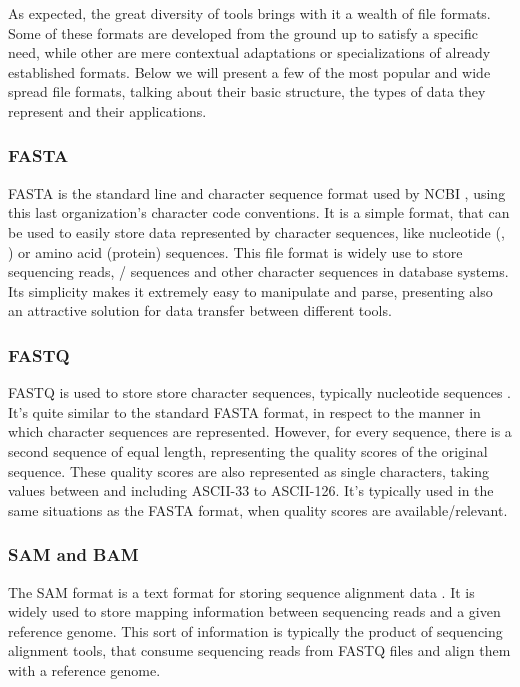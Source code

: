 As expected, the great diversity of \rnaseq{} tools brings with it a wealth of
file formats. Some of these formats are developed from the ground up to satisfy
a specific need, while other are mere contextual adaptations or specializations
of already established formats. Below we will present a few of the most popular
and wide spread file formats, talking about their basic structure, the types of
data they represent and their applications.

\subsubsection*{FASTA}

FASTA is the standard line and character sequence format used by NCBI
\cite{ncbi:fasta}, using this last organization's character code conventions. It
is a simple format, that can be used to easily store data represented by
character sequences, like nucleotide (\dna, \rna) or amino acid (protein)
sequences. This file format is widely use to store sequencing reads, \dna/\rna{}
sequences and other character sequences in database systems. Its simplicity
makes it extremely easy to manipulate and parse, presenting also an attractive
solution for data transfer between different tools.

\subsubsection*{FASTQ}

FASTQ is used to store store character sequences, typically nucleotide sequences
\cite{Cock2010}. It's quite similar to the standard FASTA format, in respect to
the manner in which character sequences are represented. However, for every
sequence, there is a second sequence of equal length, representing the quality
scores of the original sequence. These quality scores are also represented as
single characters, taking values between and including ASCII-33 to ASCII-126.
It's typically used in the same situations as the FASTA format, when quality
scores are available/relevant.

\subsubsection*{SAM and BAM}

The SAM format is a text format for storing sequence alignment data
\cite{genome:sam}. It is widely used to store mapping information between
sequencing reads and a given reference genome. This sort of information is
typically the product of sequencing alignment tools, that consume sequencing
reads from FASTQ files and align them with a reference genome.

